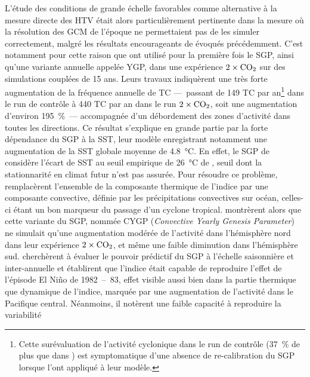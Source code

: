 \documentclass[../main.tex]{subfiles}
\begin{document}
L'étude des conditions de grande échelle favorables comme alternative à la mesure directe des HTV était alors particulièrement pertinente dans la mesure où la
résolution des GCM de l'époque ne permettaient pas de les simuler correctement, malgré les résultats encourageants de \cite{broccoli_can_1990} évoqués
précédemment. C'est notamment pour cette raison que \hbox{\cite{ryan_tropical_1992}} ont utilisé pour la première fois le SGP, ainsi qu'une variante annuelle
appelée YGP, dans une expérience \ensuremath{2\times\ce{CO2}} sur des simulations couplées de \num{15} ans. Leurs travaux indiquèrent une très forte
augmentation de la fréquence annuelle de TC ---~passant de \num{149} TC par an\footnote{Cette surévaluation de l'activité cyclonique dans le run de contrôle
(\SI{37}{\percent} de plus que dans \cite{gray_tropical_1975}) est symptomatique d'une absence de re-calibration du SGP lorsque \cite{ryan_tropical_1992}
l'ont appliqué à leur modèle.} dans le run de contrôle à \num{440} TC par an dans le run \ensuremath{2\times\ce{CO2}}, soit une augmentation d'environ
\SI{195}{\percent}~--- accompagnée d'un débordement des zones d'activité dans toutes les directions. Ce résultat s'explique en grande partie par la forte
dépendance du SGP à la SST, leur modèle enregistrant notamment une augmentation de la SST globale moyenne de \SI{4.8}{\degreeCelsius}. En effet, le SGP de
\citeauthor{gray_tropical_1975} considère l'écart de SST au seuil empirique de \SI{26}{\degreeCelsius} de \textcite{palmen_formation_1948}, seuil dont la
stationnarité en climat futur n'est pas assurée. Pour résoudre ce problème, \textcite{royer_gcm_1998} remplacèrent l'ensemble de la composante thermique de
l'indice par une composante convective, définie par les précipitations convectives sur océan, celles-ci étant un bon marqueur du passage d'un cyclone tropical.
\textcite{royer_gcm_1998} montrèrent alors que cette variante du SGP, nommée CYGP (\textit{Convective Yearly Genesis Parameter}) ne simulait qu'une augmentation
modérée de l'activité dans l'hémisphère nord dans leur expérience \ensuremath{2\times\ce{CO2}}, et même une faible diminution dans l'hémisphère sud.
\mbox{\cite{watterson_seasonal_1995}} cherchèrent à évaluer le pouvoir prédictif du SGP à l'échelle saisonnière et inter-annuelle et établirent que l'indice
était capable de reproduire l'effet de l'épisode El Niño de \num{1982}~--~\num{83}, effet visible  aussi bien dans la partie thermique que dynamique de
l'indice, marquée par une augmentation de l'activité dans le Pacifique central. Néanmoins, il notèrent une faible capacité à reproduire la variabilité
\end{document}
